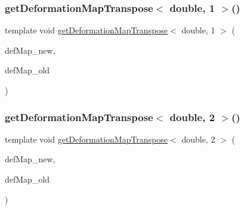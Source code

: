 \mbox{\label{function_evaluations_8cc_a7e7354d28657df00b72c866eccede24a}} 
\subsubsection{\texorpdfstring{getDeformationMapTranspose$<$ double, 1 $>$()}{getDeformationMapTranspose< double, 1 >()}}
{\footnotesize\ttfamily template void \mbox{\hyperlink{group___evaluation_functions_gad4003712a2346a79e13bdbfcad4d1e1c}{get\+Deformation\+Map\+Transpose}}$<$ double, 1 $>$ (\begin{DoxyParamCaption}\item[{\mbox{\hyperlink{structdeformation_map}{deformation\+Map}}$<$ double, 1 $>$ \&}]{def\+Map\+\_\+new,  }\item[{\mbox{\hyperlink{structdeformation_map}{deformation\+Map}}$<$ double, 1 $>$ \&}]{def\+Map\+\_\+old }\end{DoxyParamCaption})}

\mbox{\label{function_evaluations_8cc_a06a40fe8ccce6ea8a8005e65e4495a90}} 
\subsubsection{\texorpdfstring{getDeformationMapTranspose$<$ double, 2 $>$()}{getDeformationMapTranspose< double, 2 >()}}
{\footnotesize\ttfamily template void \mbox{\hyperlink{group___evaluation_functions_gad4003712a2346a79e13bdbfcad4d1e1c}{get\+Deformation\+Map\+Transpose}}$<$ double, 2 $>$ (\begin{DoxyParamCaption}\item[{\mbox{\hyperlink{structdeformation_map}{deformation\+Map}}$<$ double, 2 $>$ \&}]{def\+Map\+\_\+new,  }\item[{\mbox{\hyperlink{structdeformation_map}{deformation\+Map}}$<$ double, 2 $>$ \&}]{def\+Map\+\_\+old }\end{DoxyParamCaption})}

\mbox{\label{function_evaluations_8cc_a867f90eaceee3244d8e5fd5692fe0117}} 
